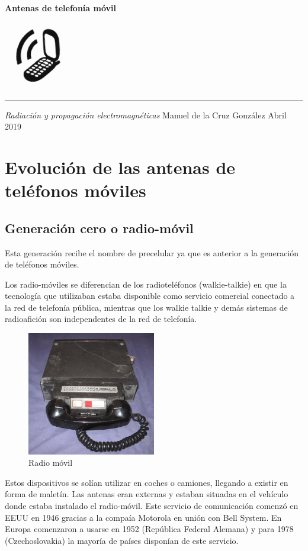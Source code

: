 \documentclass[a4paper,11pt,titlepage]{article}
\begin{document}
\begin{titlepage}
  \vspace*{4cm}
  {\fontsize{28}{34}\selectfont\bfseries Antenas de telefonía móvil}
  \par
  \vspace{0.5cm}
  \centering
  \includegraphics[height=3cm]{movilportada} \\
  \vspace{0.5cm}
  {\color{gris}\hrule}
  \Large{\itshape Radiación y propagación electromagnéticas}
  \vfill
  {\large Manuel de la Cruz González \hfill Abril 2019}
\end{titlepage}
\tableofcontents
\newpage
\section{Evolución de las antenas de teléfonos móviles}
\subsection{Generación cero o radio-móvil}
Esta generación recibe el nombre de precelular ya que es anterior a la generación de teléfonos móviles. \par
Los radio-móviles se diferencian de los radioteléfonos (walkie-talkie) en que la tecnología que utilizaban estaba disponible como servicio comercial conectado a la red de telefonía pública, mientras que los walkie talkie y demás sistemas de radioafición son independentes de la red de telefonía.\par
\begin{figure}[h]
\centering
\includegraphics[width=0.5\textwidth]{cero}
\caption{Radio móvil}

\label{imagencero}
\end{figure}
Estos dispositivos se solían utilizar en coches o camiones, llegando a existir en forma de maletín. Las antenas eran externas y estaban situadas en el vehículo donde estaba instalado el radio-móvil.
Este servicio de comunicación comenzó en EEUU en 1946 gracias a la compaía Motorola en unión con Bell System. En Europa comenzaron a usarse en 1952 (República Federal Alemana) y para 1978 (Czechoslovakia) la mayoría de países disponían de este servicio.
\end{document}
